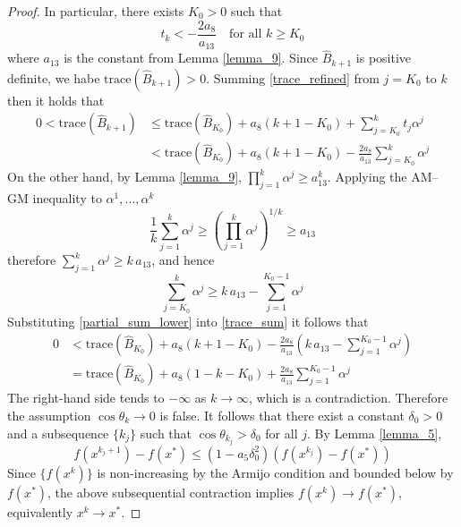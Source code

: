 \documentclass[12pt,a4paper,draft]{article}  %
\newcommand{\bibfile}{\jobname.bib}  %
\newcounter{cite}
\theoremstyle{definition}
\numberwithin{equation}{section}
\begin{document}
\begin{proof}
        In particular, there exists $K_0>0$ such that
        \begin{equation}
                t_k < -\frac{2a_8}{a_{13}} \quad \text{for all } k\geq K_0
        \end{equation}
        where $a_{13}$ is the constant from Lemma \ref{lemma_9}. Since $\hat{B}_{k+1}$ is positive definite, we habe $\mathrm{trace}(\hat{B}_{k+1})>0$. Summing \eqref{trace_refined} from $j=K_0$ to $k$ then it holds that
        \begin{equation}\label{trace_sum}
        \begin{aligned}
                0 < \mathrm{trace}(\hat{B}_{k+1}) &\leq \mathrm{trace}(\hat{B}_{K_0}) + a_8(k+1-K_0) + \sum_{j=K_0}^{k}t_j\alpha^j\\
                &< \mathrm{trace}(\hat{B}_{K_0}) + a_8(k+1-K_0) - \frac{2a_8}{a_{13}}\sum_{j=K_0}^{k}\alpha^j
        \end{aligned}
        \end{equation}
        On the other hand, by Lemma \ref{lemma_9}, $\prod_{j=1}^k\alpha^j \geq a_{13}^k$. Applying the AM--GM inequality to $\alpha^1,\ldots,\alpha^k$
        \[
        \frac{1}{k}\sum_{j=1}^{k}\alpha^j \geq \left(\prod_{j=1}^{k}\alpha^j\right)^{1/k} \geq a_{13}
        \]
        therefore $\sum_{j=1}^k\alpha^j \geq k\,a_{13}$, and hence
        \begin{equation}\label{partial_sum_lower}
                \sum_{j=K_0}^{k}\alpha^j \geq k\,a_{13} - \sum_{j=1}^{K_0-1}\alpha^j
        \end{equation}
        Substituting \eqref{partial_sum_lower} into \eqref{trace_sum} it follows that
        \[
        \begin{aligned}
                0 &< \mathrm{trace}(\hat{B}_{K_0}) + a_8(k+1-K_0) - \frac{2a_8}{a_{13}}\left(k\,a_{13} - \sum_{j=1}^{K_0-1}\alpha^j\right)\\
                &= \mathrm{trace}(\hat{B}_{K_0}) + a_8(1-k-K_0) + \frac{2a_8}{a_{13}}\sum_{j=1}^{K_0-1}\alpha^j
        \end{aligned}
        \]
        The right-hand side tends to $-\infty$ as $k\to\infty$, which is a contradiction. Therefore the assumption $\cos\theta_k\to 0$ is false. It follows that there exist a constant $\delta_0>0$ and a subsequence $\{k_j\}$ such that $\cos\theta_{k_j}>\delta_0$ for all $j$. By Lemma \ref{lemma_5},
        \[
        f(x^{k_j+1}) - f(x^\ast) \leq (1-a_5\delta_0^2)(f(x^{k_j}) - f(x^\ast))
        \]
        Since $\{f(x^k)\}$ is non-increasing by the Armijo condition and bounded below by $f(x^\ast)$, the above subsequential contraction implies $f(x^k)\to f(x^\ast)$, equivalently $x^k\to x^\ast$.
\end{proof}


\nocite{*}

\end{document}
